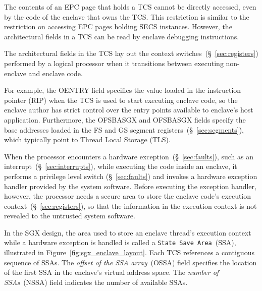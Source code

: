 The contents of an EPC page that holds a TCS cannot be directly accessed, even
by the code of the enclave that owns the TCS. This restriction is similar to the
restriction on accessing EPC pages holding SECS instances. However, the
architectural fields in a TCS can be read by enclave debugging instructions.

The architectural fields in the TCS lay out the context
switches~(\S~\ref{sec:registers}) performed by a logical processor when it
transitions between executing non-enclave and enclave code.

For example, the OENTRY field specifies the value loaded in the instruction
pointer (RIP) when the TCS is used to start executing enclave code, so the
enclave author has strict control over the entry points available to enclave's
host application. Furthermore, the OFSBASGX and OFSBASGX fields specify the
base addresses loaded in the FS and GS segment
registers~(\S~\ref{sec:segments}), which typically point to Thread Local
Storage (TLS).


\label{sec:sgx_ssa}



When the processor encounters a hardware exception~(\S~\ref{sec:faults}), such
as an interrupt~(\S~\ref{sec:interrupts}), while executing the code inside an
enclave, it performs a privilege level switch (\S~\ref{sec:faults}) and invokes
a hardware exception handler provided by the system software. Before executing
the exception handler, however, the processor needs a secure area to store the
enclave code's execution context~(\S~\ref{sec:registers}), so that the
information in the execution context is not revealed to the untrusted system
software.


In the SGX design, the area used to store an enclave thread's execution context
while a hardware exception is handled is called a \texttt{State Save
Area}~(SSA), illustrated in Figure~\ref{fig:sgx_enclave_layout}. Each TCS
references a contiguous sequence of SSAs. The \textit{offset of the SSA
array}~(OSSA) field specifies the location of the first SSA in the enclave's
virtual address space. The \textit{number of SSAs}~(NSSA) field indicates the
number of available SSAs.

